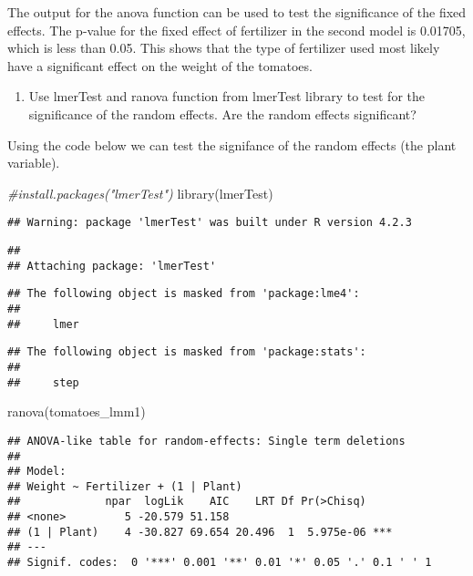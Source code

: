 \documentclass[
]{article}
\newenvironment{Shaded}{\begin{snugshade}}{\end{snugshade}}
\newcommand{\CommentTok}[1]{\textcolor[rgb]{0.56,0.35,0.01}{\textit{#1}}}
\newcommand{\FunctionTok}[1]{\textcolor[rgb]{0.00,0.00,0.00}{#1}}
\newcommand{\NormalTok}[1]{#1}
\providecommand{\tightlist}{%
  \setlength{\itemsep}{0pt}\setlength{\parskip}{0pt}}
\begin{document}
The output for the anova function can be used to test the significance
of the fixed effects. The p-value for the fixed effect of fertilizer in
the second model is 0.01705, which is less than 0.05. This shows that
the type of fertilizer used most likely have a significant effect on the
weight of the tomatoes.

\begin{enumerate}
\def\labelenumi{\alph{enumi}.}
\setcounter{enumi}{5}
\tightlist
\item
  Use lmerTest and ranova function from lmerTest library to test for the
  significance of the random effects. Are the random effects
  significant?
\end{enumerate}

Using the code below we can test the signifance of the random effects
(the plant variable).

\begin{Shaded}
\begin{Highlighting}[]
\CommentTok{\#install.packages("lmerTest")}
\FunctionTok{library}\NormalTok{(lmerTest)}
\end{Highlighting}
\end{Shaded}

\begin{verbatim}
## Warning: package 'lmerTest' was built under R version 4.2.3
\end{verbatim}

\begin{verbatim}
## 
## Attaching package: 'lmerTest'
\end{verbatim}

\begin{verbatim}
## The following object is masked from 'package:lme4':
## 
##     lmer
\end{verbatim}

\begin{verbatim}
## The following object is masked from 'package:stats':
## 
##     step
\end{verbatim}

\begin{Shaded}
\begin{Highlighting}[]
\FunctionTok{ranova}\NormalTok{(tomatoes\_lmm1)}
\end{Highlighting}
\end{Shaded}

\begin{verbatim}
## ANOVA-like table for random-effects: Single term deletions
## 
## Model:
## Weight ~ Fertilizer + (1 | Plant)
##             npar  logLik    AIC    LRT Df Pr(>Chisq)    
## <none>         5 -20.579 51.158                         
## (1 | Plant)    4 -30.827 69.654 20.496  1  5.975e-06 ***
## ---
## Signif. codes:  0 '***' 0.001 '**' 0.01 '*' 0.05 '.' 0.1 ' ' 1
\end{verbatim}
\end{document}
